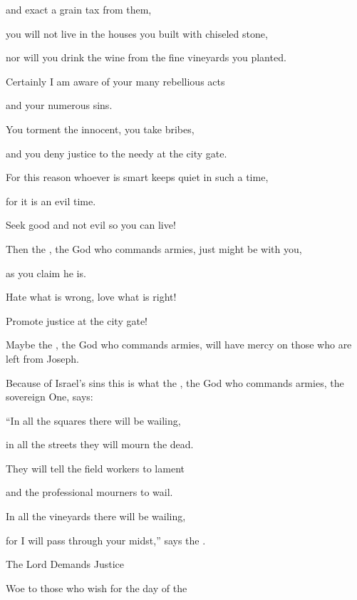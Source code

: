 {\par }{\Q and exact
a grain
tax
from
them,
\par }{\Q you will not
live
in the houses
you built
with chiseled stone,
\par }{\Q nor
will you drink
the
wine
from the fine
vineyards
you planted.
\par }{\Q {}Certainly
I am aware
of your many
rebellious acts
\par }{\Q and your numerous
sins.
\par }{\Q You torment
the innocent,
you take
bribes,
\par }{\Q and you deny justice
to the needy
at the city gate.
\par }{\Q {}For this reason
whoever
is
smart
keeps quiet in such a time,
\par }{\Q for
it is an evil
time.
\par }{\Q {}Seek
good
and not
evil
so
you can live!
\par }{\Q Then
the {}, the God
who commands armies,
just
might be with
you,
\par }{\Q as you claim he is.
\par }{\Q {}Hate
what is wrong,
love
what is right!
\par }{\Q Promote
justice
at the city gate!

\par }{\Q Maybe
the {}, the God
who commands armies,
will have mercy
on those who are left
from Joseph.
\par }{\Q {}Because
of Israel’s sins this is what
the {}, the God
who commands armies,
the sovereign One,
says:
\par }{\Q “In all
the squares
there will be wailing,
\par }{\Q in all
the streets
they will mourn the dead.
\par }{\Q They will tell
the field workers
to lament
\par }{\Q and the professional
mourners
to wail.
\par }{\Q {}In all
the vineyards
there will be wailing,
\par }{\Q for
I will pass
through your midst,”
says
the {}.
\par }{\SH The Lord Demands Justice
\par }{\Q {}Woe
to those who wish
for the
day
of the
{}

}
